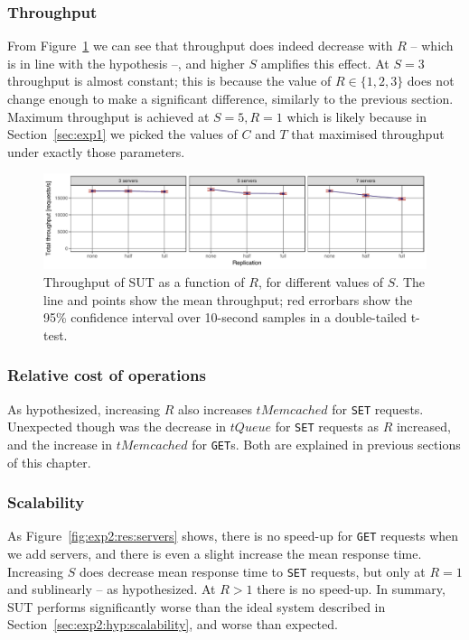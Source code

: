 \documentclass[11pt]{article}
\newcommand{\get}[0]{\texttt{GET}}
\newcommand{\set}[0]{\texttt{SET}}
\begin{document}
\subsubsection{Throughput}

From Figure~\ref{fig:exp2:res:throughput} we can see that throughput does indeed decrease with $R$ -- which is in line with the hypothesis --, and higher $S$ amplifies this effect. At $S=3$ throughput is almost constant; this is because the value of $R \in \{1,2,3\}$ does not change enough to make a significant difference, similarly to the previous section. Maximum throughput is achieved at $S=5, R=1$ which is likely because in Section~\ref{sec:exp1} we picked the values of $C$ and $T$ that maximised throughput under exactly those parameters.

\begin{figure}[h]
\centering
\includegraphics[width=\textwidth]{../results/replication/graphs/tp_vs_replication_all.pdf}
\caption{Throughput of SUT as a function of $R$, for different values of $S$. The line and points show the mean throughput; red errorbars show the 95\% confidence interval over 10-second samples in a double-tailed t-test.}
\label{fig:exp2:res:throughput}
\end{figure}

\subsubsection{Relative cost of operations}
As hypothesized, increasing $R$ also increases $tMemcached$ for \set{} requests. Unexpected though was the decrease in $tQueue$ for \set{} requests as $R$ increased, and the increase in $tMemcached$ for \get{}s. Both are explained in previous sections of this chapter.

\subsubsection{Scalability}
As Figure~\ref{fig:exp2:res:servers} shows, there is no speed-up for \get{} requests when we add servers, and there is even a slight increase the mean response time. Increasing $S$ does decrease mean response time to \set{} requests, but only at $R=1$ and sublinearly -- as hypothesized. At $R>1$ there is no speed-up. In summary, SUT performs significantly worse than the ideal system described in Section~\ref{sec:exp2:hyp:scalability}, and worse than expected.
\end{document}
